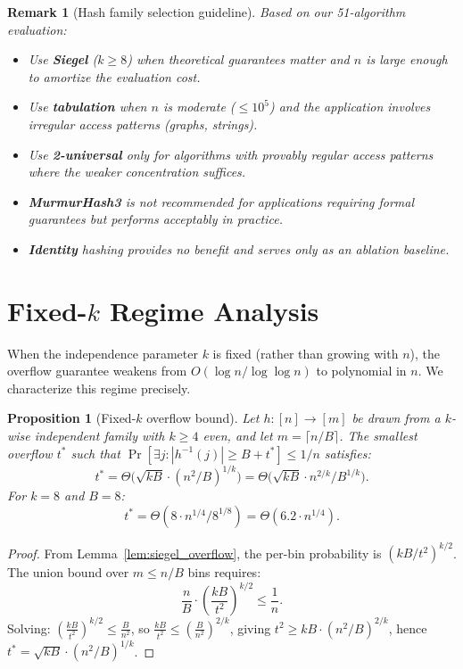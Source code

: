 \documentclass[11pt]{article}
\newtheorem{proposition}[theorem]{Proposition}
\newtheorem{remark}[theorem]{Remark}
\begin{document}
\begin{remark}[Hash family selection guideline]
Based on our 51-algorithm evaluation:
\begin{itemize}
\item Use \textbf{Siegel} ($k \ge 8$) when theoretical guarantees matter
  and $n$ is large enough to amortize the evaluation cost.
\item Use \textbf{tabulation} when $n$ is moderate ($\le 10^5$) and the
  application involves irregular access patterns (graphs, strings).
\item Use \textbf{2-universal} only for algorithms with provably regular
  access patterns where the weaker concentration suffices.
\item \textbf{MurmurHash3} is not recommended for applications requiring
  formal guarantees but performs acceptably in practice.
\item \textbf{Identity} hashing provides no benefit and serves only as an
  ablation baseline.
\end{itemize}
\end{remark}

\section{Fixed-$k$ Regime Analysis}
\label{app:fixedk}

When the independence parameter $k$ is fixed (rather than growing with $n$),
the overflow guarantee weakens from $O(\log n / \log\log n)$ to polynomial
in $n$.  We characterize this regime precisely.

\begin{proposition}[Fixed-$k$ overflow bound]
\label{prop:fixedk}
Let $h: [n] \to [m]$ be drawn from a $k$-wise independent family with
$k \ge 4$ even, and let $m = \lceil n/B \rceil$.  The smallest overflow $t^*$
such that $\Pr[\exists j: |h^{-1}(j)| \ge B + t^*] \le 1/n$ satisfies:
\[
  t^* = \Theta\bigl(\sqrt{kB} \cdot (n^2/B)^{1/k}\bigr)
  = \Theta\bigl(\sqrt{kB} \cdot n^{2/k} / B^{1/k}\bigr).
\]
For $k = 8$ and $B = 8$:
\[
  t^* = \Theta(8 \cdot n^{1/4} / 8^{1/8}) = \Theta(6.2 \cdot n^{1/4}).
\]
\end{proposition}

\begin{proof}
From Lemma~\ref{lem:siegel_overflow}, the per-bin probability is
$(kB/t^2)^{k/2}$.  The union bound over $m \le n/B$ bins requires:
\[
  \frac{n}{B} \cdot \left(\frac{kB}{t^2}\right)^{k/2} \le \frac{1}{n}.
\]
Solving: $\left(\frac{kB}{t^2}\right)^{k/2} \le \frac{B}{n^2}$, so
$\frac{kB}{t^2} \le \left(\frac{B}{n^2}\right)^{2/k}$, giving
$t^2 \ge kB \cdot (n^2/B)^{2/k}$, hence
$t^* = \sqrt{kB} \cdot (n^2/B)^{1/k}$.
\end{proof}
\end{document}

